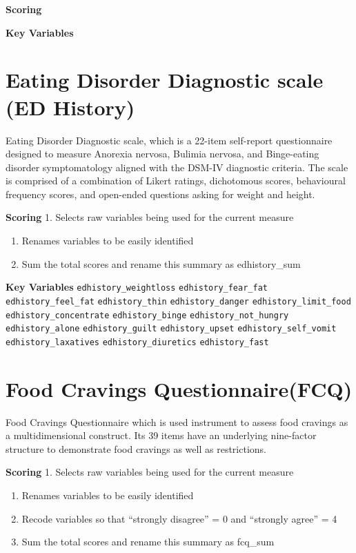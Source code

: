\documentclass[
]{book}
\begin{document}
\textbf{Scoring}

\textbf{Key Variables}

\section{Eating Disorder Diagnostic scale (ED History)}\label{eating-disorder-diagnostic-scale-ed-history}

Eating Disorder Diagnostic scale, which is a 22-item self-report
questionnaire designed to measure Anorexia nervosa, Bulimia nervosa, and
Binge-eating disorder symptomatology aligned with the DSM-IV diagnostic
criteria. The scale is comprised of a combination of Likert ratings,
dichotomous scores, behavioural frequency scores, and open-ended
questions asking for weight and height.

\textbf{Scoring} 1. Selects raw variables being used for the current measure

\begin{enumerate}
\def\labelenumi{\arabic{enumi}.}
\setcounter{enumi}{1}
\item
  Renames variables to be easily identified
\item
  Sum the total scores and rename this summary as edhistory\_sum
\end{enumerate}

\textbf{Key Variables} \texttt{edhistory\_weightloss} \texttt{edhistory\_fear\_fat}
\texttt{edhistory\_feel\_fat} \texttt{edhistory\_thin} \texttt{edhistory\_danger}
\texttt{edhistory\_limit\_food} \texttt{edhistory\_concentrate} \texttt{edhistory\_binge}
\texttt{edhistory\_not\_hungry} \texttt{edhistory\_alone} \texttt{edhistory\_guilt}
\texttt{edhistory\_upset} \texttt{edhistory\_self\_vomit} \texttt{edhistory\_laxatives}
\texttt{edhistory\_diuretics} \texttt{edhistory\_fast}

\section{Food Cravings Questionnaire(FCQ)}\label{food-cravings-questionnairefcq}

Food Cravings Questionnaire which is used instrument to assess food
cravings as a multidimensional construct. Its 39 items have an
underlying nine-factor structure to demonstrate food cravings as well as
restrictions.

\textbf{Scoring} 1. Selects raw variables being used for the current measure

\begin{enumerate}
\def\labelenumi{\arabic{enumi}.}
\setcounter{enumi}{1}
\item
  Renames variables to be easily identified
\item
  Recode variables so that ``strongly disagree'' = 0 and ``strongly
  agree'' = 4
\item
  Sum the total scores and rename this summary as fcq\_sum
\end{enumerate}
\end{document}
